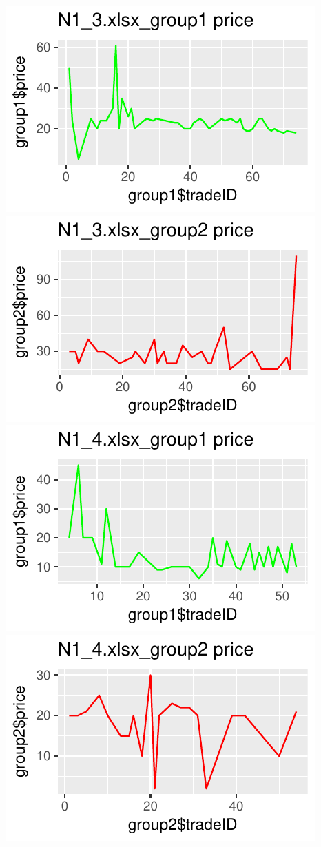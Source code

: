 \documentclass[]{article}
\begin{document}
\includegraphics{finance_homework_files/figure-latex/unnamed-chunk-4-5.pdf}
\includegraphics{finance_homework_files/figure-latex/unnamed-chunk-4-6.pdf}
\includegraphics{finance_homework_files/figure-latex/unnamed-chunk-4-7.pdf}
\includegraphics{finance_homework_files/figure-latex/unnamed-chunk-4-8.pdf}
\end{document}
